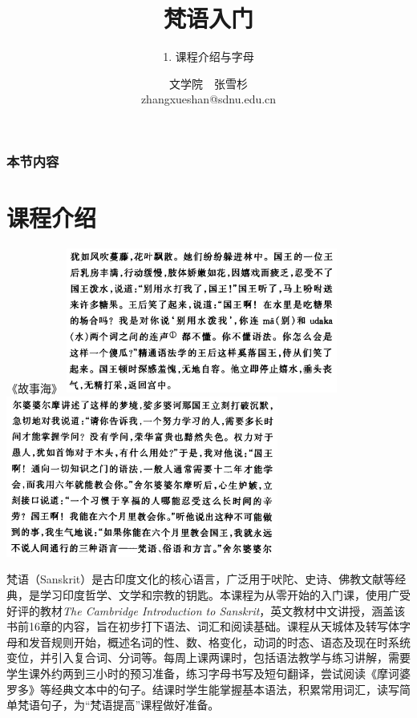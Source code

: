 \documentclass[17pt]{beamer}
\title{{梵语入门}}
\subtitle{1. 课程介绍与字母}
\author[张雪杉]{文学院~~张雪杉 \\ zhangxueshan@sdnu.edu.cn}
\date{}
\begin{document}
	


\begin{frame}
  \titlepage
\end{frame}

\begin{frame}
  \frametitle{本节内容}
  \tableofcontents
\end{frame}

\section{课程介绍}

\begin{frame}{《故事海》}
    \centering
    \hspace*{-1cm} %
    \includegraphics[width=0.67\textwidth]{satavahana1.png}
    \hspace*{1cm} %
    \includegraphics[width=0.67\textwidth]{satavahana2.png}
\end{frame}

\begin{frame}{\insertsection }
  \footnotesize
    \hspace*{2em}梵语（Sanskrit）是古印度文化的核心语言，广泛用于吠陀、史诗、佛教文献等经典，是学习印度哲学、文学和宗教的钥匙。本课程为从零开始的入门课，使用广受好评的教材\textit{The Cambridge Introduction to Sanskrit}，英文教材中文讲授，涵盖该书前16章的内容，旨在初步打下语法、词汇和阅读基础。课程从天城体及转写体字母和发音规则开始，概述名词的性、数、格变化，动词的时态、语态及现在时系统变位，并引入复合词、分词等。每周上课两课时，包括语法教学与练习讲解，需要学生课外约两到三小时的预习准备，练习字母书写及短句翻译，尝试阅读《摩诃婆罗多》等经典文本中的句子。结课时学生能掌握基本语法，积累常用词汇，读写简单梵语句子，为“梵语提高”课程做好准备。
\end{frame}
\end{document}
